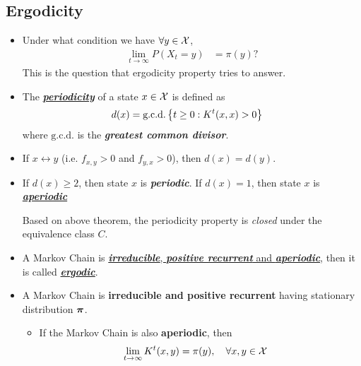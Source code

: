 \documentclass[11pt]{article}
\begin{document}
\subsection{Ergodicity}
\begin{itemize}
\item Under what condition we have $\forall y \in {\mathcal X}$,
\begin{align}
\lim_{t\rightarrow \infty}P(X_t = y) &= \pi(y) ?
\end{align} This is the question that ergodicity property tries to answer.

\item \begin{definition}
The \underline{\textbf{\emph{periodicity}}} of a state $x \in {\mathcal X}$ is defined as 
\begin{align}
d(x) &= \text{g.c.d.}\left\{t\ge 0: K^{t}(x, x) > 0\right\}
\end{align} where $\text{g.c.d.}$ is the \emph{\textbf{greatest common divisor}}. 
\end{definition}

\item \begin{theorem}
If $x\leftrightarrow y$ (i.e. $f_{x,y} > 0$ and $f_{y,x} > 0$), then $d(x) = d(y)$.
\end{theorem}

\item \begin{definition}
If $d(x) \ge 2$, then state $x$ is \emph{\textbf{periodic}}. If $d(x) = 1$, then state $x$ is \underline{\emph{\textbf{aperiodic}}}
\end{definition}
Based on above theorem, the periodicity property is \emph{closed} under the equivalence class $C$.

\item \begin{definition}
A Markov Chain is  \underline{\emph{\textbf{irreducible}}, \emph{\textbf{positive recurrent}} and \emph{\textbf{aperiodic}}}, then it is called \underline{\emph{\textbf{ergodic}}}.
\end{definition}

\item \begin{theorem}\label{thm: ergodic}
A Markov Chain is \textbf{irreducible and positive recurrent} having stationary distribution $\boldsymbol{\pi}$. 
\begin{itemize}
\item If the Markov Chain is also \textbf{aperiodic}, then 
\begin{align}
\lim_{t\rightarrow \infty}K^{t}(x, y) &= \pi(y), \quad \forall x, y\in {\mathcal X} \label{eqn: mc_ergodic}
\end{align} 


\end{itemize}
\end{theorem}
\end{itemize}
\end{document}
